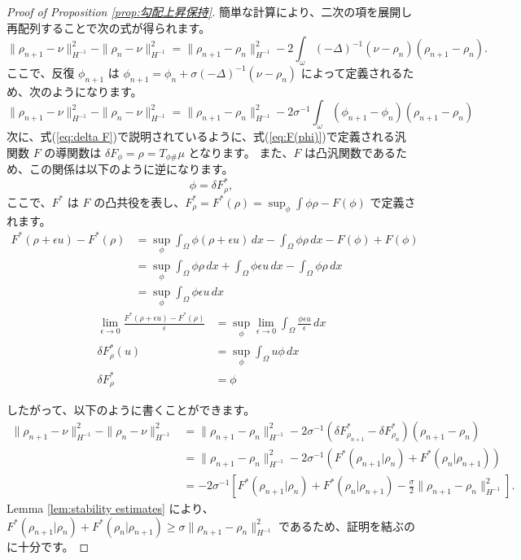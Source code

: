 \documentclass{jsarticle}
\theoremstyle{definition}
\begin{document}
\begin{proof}[Proof of Proposition \ref{prop:勾配上昇保持}]
  簡単な計算により、二次の項を展開し再配列することで次の式が得られます。
  \[
    \|\rho_{n+1} - \nu\|_{H^{-1}}^2 - \|\rho_n - \nu\|_{H^{-1}}^2 = \|\rho_{n+1} - \rho_n\|_{H^{-1}}^2 - 2 \int_\omega (-\Delta)^{-1}(\nu - \rho_n)(\rho_{n+1} - \rho_n).
  \]
  ここで、反復 $\phi_{n+1}$ は $\phi_{n+1} = \phi_n + \sigma(-\Delta)^{-1}(\nu - \rho_n)$ によって定義されるため、次のようになります。
  \[
    \|\rho_{n+1} - \nu\|_{H^{-1}}^2 - \|\rho_n - \nu\|_{H^{-1}}^2 = \|\rho_{n+1} - \rho_n\|_{H^{-1}}^2 - 2\sigma^{-1}\int_\omega (\phi_{n+1} - \phi_n)(\rho_{n+1} - \rho_n)
  \]
  次に、式(\ref{eq:delta F})で説明されているように、式(\ref{eq:F(phi)})で定義される汎関数 $F$ の導関数は $\delta F_\phi = \rho = T_{\phi \#} \mu$ となります。
  {\color{teal}
  また、$F$ は凸汎関数であるため、この関係は以下のように逆になります。
  \[
    \phi = \delta F^*_\rho,
  \]
  }
  ここで、$F^*$ は $F$ の凸共役を表し、$F^*_{\rho} = F^*(\rho) = \sup_\phi \int \phi \rho - F(\phi)$ で定義されます。
  \begin{align*}
    F^*(\rho + \epsilon u) - F^*(\rho)  &= \sup_\phi \int_\Omega \phi (\rho + \epsilon u) \, dx - \int_\Omega \phi \rho \, dx  - F(\phi) + F(\phi) \\
                                        &= \sup_\phi \int_\Omega \phi \rho \, dx  + \int_\Omega \phi \epsilon u \, dx - \int_\Omega \phi \rho \, dx\\
                                        &= \sup_\phi \int_\Omega \phi \epsilon u \, dx
  \end{align*}
  \begin{align*}
    \lim_{\epsilon \to 0} \frac{F^*(\rho + \epsilon u) - F^*(\rho)}{\epsilon}  &= \sup_\phi \lim_{\epsilon \to 0} \int_\Omega \frac{ \phi \epsilon u }{\epsilon} \, dx\\
                                                          \delta F^*_{\rho}(u) &= \sup_\phi \int_\Omega u \phi \, dx \\
                                                          \delta F^*_{\rho} &= \phi
  \end{align*}


  したがって、以下のように書くことができます。
  \begin{align*}
      \|\rho_{n+1} - \nu\|_{H^{-1}}^2 - \|\rho_n - \nu\|_{H^{-1}}^2 &= \|\rho_{n+1} - \rho_n\|_{H^{-1}}^2 - 2\sigma^{-1} \left( \delta F^*_{\rho_{n + 1}} - \delta F^*_{\rho_n} \right) (\rho_{n+1} - \rho_n)\\
                                                                    &= \|\rho_{n+1} - \rho_n\|_{H^{-1}}^2 - 2\sigma^{-1} \left(F^*(\rho_{n+1}|\rho_n) + F^*(\rho_n|\rho_{n+1})\right)\\
                                                                    &= - 2 \sigma^{-1}\left[ F^*(\rho_{n + 1} | \rho_n) + F^*(\rho_n | \rho_{n + 1}) - \frac{\sigma}{2} \|\rho_{n+1} - \rho_n \|_{H^{-1}}^2 \right].
  \end{align*}
  Lemma \ref{lem:stability estimates} により、$F^*(\rho_{n+1}|\rho_n) + F^*(\rho_n|\rho_{n+1}) \geq \sigma\|\rho_{n+1} - \rho_n\|^2_{H^{-1}}$ であるため、証明を結ぶのに十分です。
\end{proof}
\end{document}
